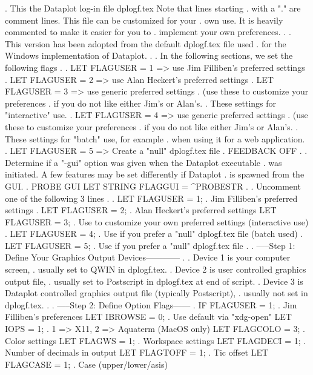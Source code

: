 .  This the Dataplot log-in file dplogf.tex  Note that lines starting
.  with a "." are comment lines.  This file can be customized for your
.  own use.  It is heavily commented to make it easier for you to
.  implement your own preferences.
.
.  This version has been adopted from the default dplogf.tex file used
.  for the Windows implementation of Dataplot.
.
.  In the following sections, we set the following flags
.
.     LET FLAGUSER = 1  => use Jim Filliben's preferred settings
.     LET FLAGUSER = 2  => use Alan Heckert's preferred settings
.     LET FLAGUSER = 3  => use generic preferred settings
.                          (use these to customize your preferences
.                          if you do not like either Jim's or Alan's.
.                          These settings for "interactive" use.
.     LET FLAGUSER = 4  => use generic preferred settings
.                          (use these to customize your preferences
.                          if you do not like either Jim's or Alan's.
.                          These settings for "batch" use, for example
.                          when using it for a web application.
.     LET FLAGUSER = 5  => Create a "null" dplogf.tex file
.
FEEDBACK OFF
.
.  Determine if a "-gui" option was given when the Dataplot executable
.  was initiated.  A few features may be set differently if Dataplot
.  is spawned from the GUI.
.
PROBE GUI
LET STRING FLAGGUI = ^PROBESTR
.
.  Uncomment one of the following 3 lines
.
. LET FLAGUSER = 1; . Jim Filliben's preferred settings
. LET FLAGUSER = 2; . Alan Heckert's preferred settings
LET FLAGUSER = 3; . Use to customize your own preferred settings (interactive use)
. LET FLAGUSER = 4; . Use if you prefer a "null" dplogf.tex file (batch used)
. LET FLAGUSER = 5; . Use if you prefer a "null" dplogf.tex file
.
. -----Step 1: Define Your Graphics Output Devices------------
.
. Device 1 is your computer screen,
.          usually set to QWIN in dplogf.tex.
. Device 2 is user controlled graphics output file,
.          usually set to Postscript in dplogf.tex at end of script.
. Device 3 is Dataplot controlled graphics output file (typically Postscript),
.          usually not set in dplogf.tex.
.
. -----Step 2: Define Option Flags------
.
IF FLAGUSER = 1;      . Jim Filliben's preferences
   LET IBROWSE = 0;   . Use default via "xdg-open"
   LET IOPS = 1;      . 1 => X11, 2 => Aquaterm (MacOS only)
   LET FLAGCOLO = 3;  . Color settings
   LET FLAGWS = 1;    . Workspace settings
   LET FLAGDECI = 1;  . Number of decimals in output
   LET FLAGTOFF = 1;  . Tic offset
   LET FLAGCASE = 1;  . Case (upper/lower/asis)
